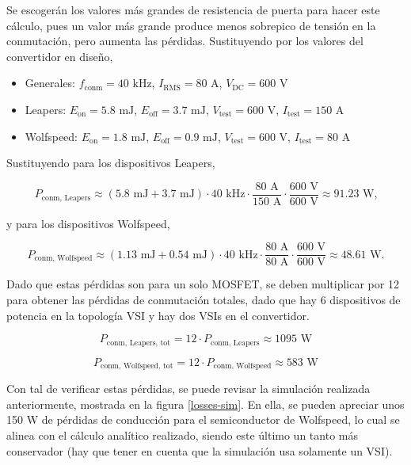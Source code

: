 Se escogerán los valores más grandes de resistencia de puerta para hacer este cálculo, pues un valor más grande produce menos sobrepico de tensión en la conmutación, pero aumenta las pérdidas. Sustituyendo por los valores del convertidor en diseño,

\begin{itemize}
	\item Generales: \(f_{\text{conm}} = 40 \text{ kHz}\), \(I_{\text{RMS}} = 80 \text{ A}\), \(V_{\text{DC}} = 600 \text{ V}\)
	\item Leapers: \(E_{\text{on}} = 5.8 \text{ mJ}\), \(E_{\text{off}} = 3.7 \text{ mJ}\), \(V_{\text{test}} = 600 \text{ V}\), \(I_{\text{test}} = 150 \text{ A}\)
	\item Wolfspeed: \(E_{\text{on}} = 1.8 \text{ mJ}\), \(E_{\text{off}} = 0.9 \text{ mJ}\), \(V_{\text{test}} = 600 \text{ V}\), \(I_{\text{test}} = 80 \text{ A}\)
\end{itemize}

Sustituyendo para los dispositivos Leapers,

\[
P_{\text{conm, Leapers}} \approx (5.8 \text{ mJ} + 3.7 \text{ mJ}) \cdot 40 \text{ kHz} \cdot \frac{80 \text{ A}}{150 \text{ A}} \cdot \frac{600 \text{ V}}{600 \text{ V}} \approx 91.23 \text{ W,}
\]

y para los dispositivos Wolfspeed,

\[
P_{\text{conm, Wolfspeed}} \approx (1.13 \text{ mJ} + 0.54 \text{ mJ}) \cdot 40 \text{ kHz} \cdot \frac{80  \text{ A}}{80 \text{ A}} \cdot \frac{600 \text{ V}}{600 \text{ V}} \approx 48.61 \text{ W.}
\]

Dado que estas pérdidas son para un solo MOSFET, se deben multiplicar por 12 para obtener las pérdidas de conmutación totales, dado que hay 6 dispositivos de potencia en la topología VSI y hay dos VSIs en el convertidor.

\[
P_{\text{conm, Leapers, tot}} = 12\cdot P_{\text{conm, Leapers}} \approx 1095 \text{ W}
\]

\[
P_{\text{conm, Wolfspeed, tot}} = 12\cdot P_{\text{conm, Wolfspeed}} \approx 583 \text{ W}
\]

Con tal de verificar estas pérdidas, se puede revisar la simulación realizada anteriormente, mostrada en la figura \ref{losses-sim}. En ella, se pueden apreciar unos 150 W de pérdidas de conducción para el semiconductor de Wolfspeed, lo cual se alinea con el cálculo analítico realizado, siendo este último un tanto más conservador (hay que tener en cuenta que la simulación usa solamente un VSI). 

